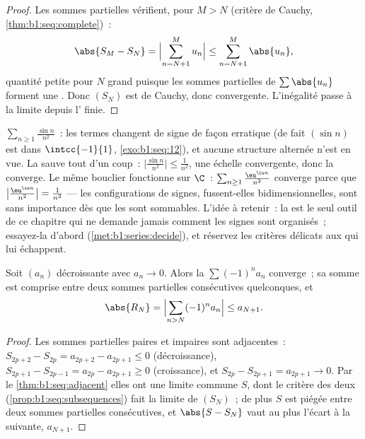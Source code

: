\begin{proof}
Les sommes partielles vérifient, pour $M > N$ (critère de Cauchy,
\cref{thm:b1:seq:complete})~:
\[
\abs{S_M - S_N} = \Bigl| \sum_{n=N+1}^{M} u_n \Bigr|
\leq \sum_{n=N+1}^{M} \abs{u_n},
\]
quantité petite pour $N$ grand puisque les sommes partielles de
$\sum\abs{u_n}$ forment une . Donc $(S_N)$ est de
Cauchy, donc convergente. L'inégalité passe à la limite depuis
l' finie.
\end{proof}

\begin{example}\label{ex:b1:series:absexamples}
$\sum_{n\geq1} \frac{\sin n}{n^2}$~: les termes changent de signe de
façon erratique (de fait $(\sin n)$ est  dans $\intcc{-1}{1}$,
\cref{exo:b1:seq:12}), et aucune structure alternée n'est en vue. La
 sauve tout d'un coup~:
$\bigl|\frac{\sin n}{n^2}\bigr| \leq \frac{1}{n^2}$, une échelle
convergente, donc la  converge. Le même bouclier fonctionne sur
$\C$~: $\sum_{n\geq1}\frac{\eu^{\iu n}}{n^2}$ converge parce que
$\bigl|\frac{\eu^{\iu n}}{n^2}\bigr| = \frac{1}{n^2}$ --- les
configurations de signes, fussent-elles bidimensionnelles, sont sans
importance dès que les  sont sommables. L'idée à retenir~: la
 est le seul outil de ce chapitre qui ne demande
jamais comment les signes sont organisés~; essayez-la d'abord
(\cref{met:b1:series:decide}), et réservez les critères délicats aux
 qui lui échappent.
\end{example}

\begin{theorem}\label{thm:b1:series:alternating}
Soit $(a_n)$ décroissante avec $a_n \to 0$. Alors la 
$\sum (-1)^n a_n$ converge~; sa somme est comprise entre deux sommes
partielles consécutives quelconques, et
\[
\abs{R_N} = \Bigl| \sum_{n > N} (-1)^n a_n \Bigr| \leq a_{N+1} .
\]
\end{theorem}

\begin{proof}
Les sommes partielles paires et impaires sont adjacentes~: $S_{2p+2}
- S_{2p} = a_{2p+2} - a_{2p+1} \leq 0$ (décroissance), $S_{2p+1} -
S_{2p-1} = a_{2p} - a_{2p+1} \geq 0$ (croissance), et $S_{2p} -
S_{2p+1} = a_{2p+1} \to 0$. Par le \cref{thm:b1:seq:adjacent} elles ont
une limite commune $S$, dont le critère des deux 
(\cref{prop:b1:seq:subsequences}) fait la limite de $(S_N)$~; de
plus $S$ est piégée entre deux sommes partielles consécutives, et
$\abs{S - S_N}$ vaut au plus l'écart à la suivante, $a_{N+1}$.
\end{proof}

